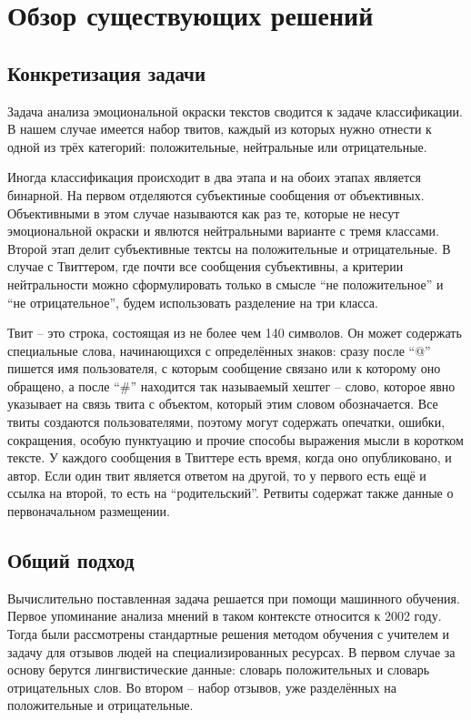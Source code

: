\chapter{Обзор существующих решений}

\section{Конкретизация задачи}
Задача анализа эмоциональной окраски текстов сводится к задаче классификации. В
нашем случае имеется набор твитов, каждый из которых нужно отнести к одной из
трёх категорий: положительные, нейтральные или отрицательные.

Иногда классификация происходит в два этапа и на обоих этапах является бинарной.
На первом отделяются субъектиные сообщения от объективных. Объективными в этом
случае называются как раз те, которые не несут эмоциональной окраски и
явлются нейтральными варианте с тремя классами. Второй этап делит субъективные
тектсы на положительные и отрицательные. В случае с Твиттером, где почти все
сообщения субъективны, а критерии нейтральности можно сформулировать только в
смысле ``не положительное'' и ``не отрицательное'', будем использовать разделение
на три класса.

Твит -- это строка, состоящая из не более чем 140 символов. Он может содержать
специальные слова, начинающихся с определённых знаков: сразу после ``@'' пишется
имя пользователя, с которым сообщение связано или к которому оно обращено,
а после ``\#'' находится так называемый хештег -- слово, которое явно указывает
на связь твита с объектом, который этим словом обозначается. Все твиты создаются
пользователями, поэтому могут содержать опечатки, ошибки, сокращения,
особую пунктуацию и прочие способы выражения мысли в коротком тексте.
У каждого сообщения в Твиттере есть время, когда оно опубликовано, и автор.
Если один твит является ответом на другой, то у первого есть ещё и ссылка на второй,
то есть на ``родительский''. Ретвиты содержат также данные о первоначальном
размещении.

\section{Общий подход}
Вычислительно поставленная задача решается при помощи машинного обучения. Первое
упоминание анализа мнений в таком контексте относится к 2002 году. Тогда были рассмотрены
стандартные решения методом обучения с учителем \cite{pang2002thumbs} и
задачу для отзывов людей на специализированных ресурсах.
В первом случае за основу берутся лингвистические данные: словарь положительных
и словарь отрицательных слов. Во втором -- набор отзывов, уже разделённых на
положительные и отрицательные.